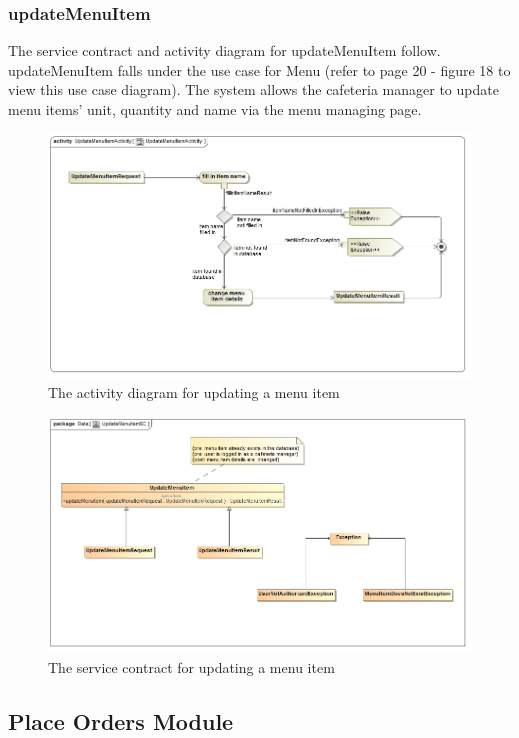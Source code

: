\documentclass[a4paper,12pt]{report}
\begin{document}
 \subsubsection{updateMenuItem}
The service contract and activity diagram for updateMenuItem follow. updateMenuItem falls under the use case for Menu (refer to page 20 - figure 18 to view this use case diagram). The system allows the cafeteria manager to update menu items' unit, quantity and name via the menu managing page.
\begin{figure}[H]
  \centering
    \includegraphics[width=1.0\textwidth]{../images/UpdateMenuItemActivity.jpg}
    \caption{The activity diagram for updating a menu item } 
\end{figure}
\begin{figure}[H]
	\centering
	\includegraphics[width=1.0\textwidth]{../images/UpdateMenuItemSC.jpg}
	\caption{The service contract for updating a menu item}
\end{figure}

\subsection{Place Orders Module}
\end{document}

